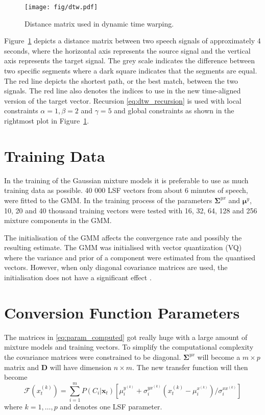 \begin{figure}[htbp]
	\begin{center}
		\texttt{[image: fig/dtw.pdf]}
		\caption{Distance matrix used in dynamic time warping.}
		\label{fig:dtw}
	\end{center}
\end{figure}
Figure~\ref{fig:dtw} depicts a distance matrix between two speech signals of approximately 4 seconds, where the horizontal axis represents the source signal and the vertical axis represents the target signal. The grey scale indicates the difference between two specific segments where a dark square indicates that the segments are equal. The red line depicts the shortest path, or the best match, between the two signals. The red line also denotes the indices to use in the new time-aligned version of the target vector. Recursion \eqref{eq:dtw_recursion} is used with local constraints $\alpha=1, \beta=2$ and $\gamma=5$ and global constraints as shown in the rightmost plot in Figure~\ref{fig:dtw}.

\section{Training Data} %
\label{sec:training_data}
In the training of the Gaussian mixture models it is preferable to use as much training data as possible. 40 000 LSF vectors from about 6 minutes of speech, were fitted to the GMM. In the training process of the parameters $\mathbf{\Sigma}^{yx}$ and $\boldsymbol{\mu}^y$, 10, 20 and 40 thousand training vectors were tested with 16, 32, 64, 128 and 256 mixture components in the GMM.

The initialisation of the GMM affects the convergence rate and possibly the resulting estimate. The GMM was initialised with vector quantization (VQ) where the variance and prior of a component were estimated from the quantised vectors. However, when only diagonal covariance matrices are used, the initialisation does not have a significant effect \cite{reynolds93}.

\section{Conversion Function Parameters} %
\label{sec:conversion_function_parameters}
The matrices in \eqref{eq:param_computed} got really huge with a large amount of mixture models and training vectors. To simplify the computational complexity the covariance matrices were constrained to be diagonal. $\mathbf{\Sigma}^{yx}$ will become a $m\times p$ matrix and $\mathbf{D}$ will have dimension $n\times m$. The new transfer function will then become
\begin{equation}
	\mathcal{F}(x_t^{(k)}) = \sum_{i=1}^{m}P(C_i \vert \mathbf{x}_t)[\mu_i^{y^{(k)}}+\sigma_i^{yx^{(k)}}  (x_t^{(k)}-\mu_i^{x^{(k)}})/\sigma_i^{xx^{(k)}}]
\end{equation}
where $k=1,\dots,p$ and denotes one LSF parameter.

